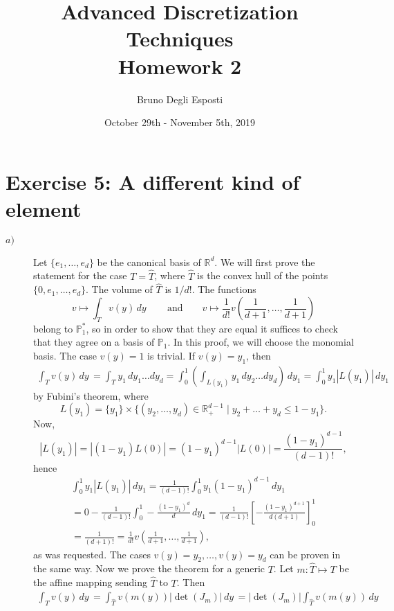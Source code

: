 \documentclass[a4paper]{article}
\title{\huge{Advanced Discretization Techniques \\
Homework 2}}
\author{\Large{Bruno Degli Esposti}}
\date{October 29th - November 5th, 2019}
\newcommand{\abs}[1]{\left\lvert#1\right\rvert}
\newcommand{\dy}{\, dy \,}
\newcommand{\R}{\mathbb{R}}
\newcommand{\Pone}{\mathbb{P}_1}
\begin{document}
\maketitle

\section*{Exercise 5: A different kind of element}
\begin{description}
\item[$a)$] Let $\{e_1,\dots,e_d\}$ be the canonical basis of $\R^d$.
	We will first prove the statement for the case $T = \hat{T}$,
	where $\hat{T}$ is the convex hull of the points $\{0,e_1,\dots,e_d\}$.
	The volume of $\hat{T}$ is $1/d!$. The functions
	\[
	v \mapsto \int_T v(y) \dy \qquad \text{and} \qquad
	v \mapsto \frac{1}{d!} v\left(\frac{1}{d+1},\dots,\frac{1}{d+1}\right)
	\]
	belong to $\Pone^*$, so in order to show that they are equal it suffices to check
	that they agree on a basis of $\Pone$. %
	In this proof, we will choose the monomial basis.
	The case $v(y) = 1$ is trivial. If $v(y) = y_1$, then
	\begin{gather*}
	\int_T v(y) \dy
	= \int_T y_1 \, dy_1 \dots dy_d
	= \int_0^1 \left( \int_{L(y_1)} y_1 \, dy_2 \dots dy_d \right) \, dy_1
	= \int_0^1 y_1 \abs{L(y_1)} \, dy_1
	\end{gather*}
	by Fubini's theorem, where
	\[
	L(y_1) = \{y_1\} \times \{(y_2,\dots,y_d) \in \R_+^{d-1}
	\mid y_2+\dots+y_d \leq 1 - y_1\}.
	\]
	Now,
	\[
	\abs{L(y_1)} = \abs{(1-y_1)L(0)}
	= (1-y_1)^{d-1} \abs{L(0)} = \frac{(1-y_1)^{d-1}}{(d-1)!},
	\]
	hence
	\begin{gather*}
	\int_0^1 y_1 \abs{L(y_1)} \, dy_1
	= \frac{1}{(d-1)!} \int_0^1 y_1 (1-y_1)^{d-1} \, dy_1 \\
	= 0 - \frac{1}{(d-1)!} \int_0^1 -\frac{(1-y_1)^d}{d} \, dy_1 
	= \frac{1}{(d-1)!} \left[ -\frac{(1-y_1)^{d+1}}{d(d+1)} \right]_0^1 \\
	= \frac{1}{(d+1)!}
	= \frac{1}{d!} v\left(\frac{1}{d+1},\dots,\frac{1}{d+1}\right),
	\end{gather*}
	as was requested. The cases $v(y) = y_2,\dots,v(y) = y_d$
	can be proven in the same way. Now we prove the theorem for a generic $T$.
	Let $m \colon \hat{T} \mapsto T$ be the affine mapping sending $\hat{T}$ to $T$.
	Then
	\begin{gather*}
	\int_T v(y) \dy
	= \int_{\hat{T}} v(m(y)) \abs{\det(J_m)} \dy
	= \abs{\det(J_m)} \int_{\hat{T}} v(m(y)) \dy \\

\end{gather*}
\end{description}
\end{document}

